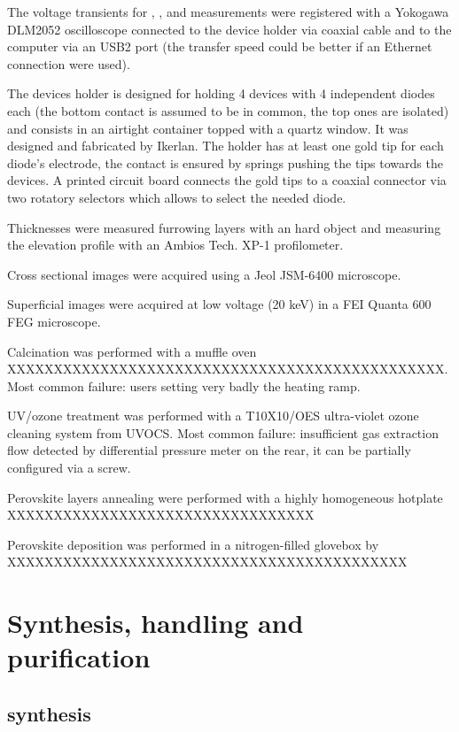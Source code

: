 	The voltage transients for , , and  measurements were registered with a Yokogawa DLM2052 oscilloscope connected to the device holder via coaxial cable and to the computer via an USB2 port (the transfer speed could be better if an Ethernet connection were used).
	
	The devices holder is designed for holding 4 devices with 4 independent diodes each (the bottom contact is assumed to be in common, the top ones are isolated) and consists in an airtight container topped with a quartz window. It was designed and fabricated by Ikerlan. The holder has at least one gold tip for each diode's electrode, the contact is ensured by springs pushing the tips towards the devices. A printed circuit board connects the gold tips to a coaxial connector via two rotatory selectors which allows to select the needed diode.
	
	Thicknesses were measured furrowing layers with an hard object and measuring the elevation profile with an Ambios Tech. XP-1 profilometer.
	
	Cross sectional  images were acquired using a Jeol JSM-6400 microscope.
	
	Superficial  images were acquired at low voltage (20 keV) in a FEI Quanta 600 FEG microscope.
	
	Calcination was performed with a muffle oven XXXXXXXXXXXXXXXXXXXXXXXXXXXXXXXXXXXXXXXXXXXXXXX. Most common failure: users setting very badly the heating ramp.
	
	UV/ozone treatment was performed with a T10X10/OES ultra-violet ozone cleaning system from UVOCS. Most common failure: insufficient gas extraction flow detected by differential pressure meter on the rear, it can be partially configured via a screw.
	
	Perovskite layers annealing were performed with a highly homogeneous hotplate XXXXXXXXXXXXXXXXXXXXXXXXXXXXXXXXX
	
	Perovskite deposition was performed in a nitrogen-filled glovebox by XXXXXXXXXXXXXXXXXXXXXXXXXXXXXXXXXXXXXXXXXXX
\section{Synthesis, handling and purification}

	\subsection{ synthesis}\label{methods-MAI}
	
